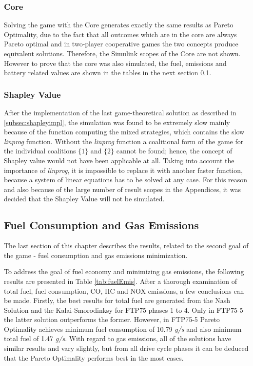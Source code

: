 \subsubsection{Core}
Solving the game with the Core generates exactly the same results as Pareto Optimality, due to the fact that all outcomes which are in the core are always Pareto optimal and in two-player cooperative games the two concepts produce equivalent solutions. Therefore, the Simulink scopes of the Core are not shown. However to prove that the core was also simulated, the fuel, emissions and battery related values are shown in the tables in the next section \ref{sec:goalresults}.

\subsubsection{Shapley Value}
After the implementation of the last game-theoretical solution as described in \ref{subsec:shapleyimpl}, the simulation was found to be extremely slow mainly because of the function computing the mixed strategies, which contains the slow \textit{linprog} function. Without the \textit{linprog} function a coalitional form of the game for the individual coalitions $\{1\}$ and $\{2\}$ cannot be found; hence, the concept of Shapley value would not have been applicable at all. Taking into account the importance of \textit{linprog}, it is impossible to replace it with another faster function, because a system of linear equations has to be solved at any case. For this reason and also because of the large number of result scopes in the Appendices, it was decided that the Shapley Value will not be simulated.

\subsection{Fuel Consumption and Gas Emissions}
\label{sec:goalresults}
The last section of this chapter describes the results, related to the second goal of the game - fuel consumption and gas emissions minimization.

To address the goal of fuel economy and minimizing gas emissions, the following results are presented in Table \ref{tab:fuelEmis}. After a thorough examination of total fuel, fuel consumption, CO, HC and NOX emissions, a few conclusions can be made. Firstly, the best results for total fuel are generated from the Nash Solution and the Kalai-Smorodinksy for FTP75 phases 1 to 4. Only in FTP75-5 the latter solution outperforms the former. However, in FTP75-5 Pareto Optimality achieves minimum fuel consumption of 10.79 \textit{g/s} and also minimum total fuel of 1.47 \textit{g/s}. With regard to gas emissions, all of the solutions have similar results and vary slightly, but from all drive cycle phases it can be deduced that the Pareto Optimality performs best in the most cases.

